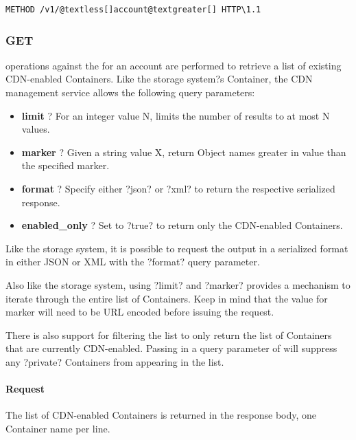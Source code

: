 \documentclass[letterpaper,10pt,english]{manual}
\begin{document}
\begin{Verbatim}[commandchars=@\[\]]
METHOD /v1/@textless[]account@textgreater[] HTTP\1.1
\end{Verbatim}


\subsubsection{GET}

 operations against the  for an account
are performed to retrieve a list of existing CDN-enabled Containers.
Like the storage system?s  Container, the CDN management service
allows the following query parameters:
\begin{itemize}
\item {} 
\textbf{limit} ? For an integer value N, limits the number of results to
at most N values.

\item {} 
\textbf{marker} ? Given a string value X, return Object names greater in
value than the specified marker.

\item {} 
\textbf{format} ? Specify either ?json? or ?xml? to return the respective
serialized response.

\item {} 
\textbf{enabled\_only} ? Set to ?true? to return only the CDN-enabled
Containers.

\end{itemize}

Like the storage system, it is possible to request the output in a
serialized format in either JSON or XML with the ?format? query
parameter.

Also like the storage system, using ?limit? and ?marker? provides a
mechanism to iterate through the entire list of Containers.  Keep in
mind that the value for marker will need to be URL encoded before
issuing the request.

There is also support for filtering the list to only return the list
of Containers that are currently CDN-enabled.  Passing in a query
parameter of  will suppress any ?private?
Containers from appearing in the list.


\paragraph{Request}

The list of CDN-enabled Containers is returned in the response body,
one Container name per line.
\end{document}
